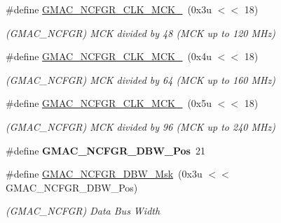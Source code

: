 \begin{DoxyCompactItemize}
\#define \mbox{\hyperlink{group__SAME70__GMAC_gae867aa8a58afa86a0424e23e58c174c1}{G\+M\+A\+C\+\_\+\+N\+C\+F\+G\+R\+\_\+\+C\+L\+K\+\_\+\+M\+C\+K\+\_}}~(0x3u $<$$<$ 18)
\begin{DoxyCompactList}\small\item\em (G\+M\+A\+C\+\_\+\+N\+C\+F\+GR) M\+CK divided by 48 (M\+CK up to 120 M\+Hz) \end{DoxyCompactList}\item 
\mbox{\label{group__SAME70__GMAC_gadc409f6fd40424194830af9921e1e638}} 
\#define \mbox{\hyperlink{group__SAME70__GMAC_gadc409f6fd40424194830af9921e1e638}{G\+M\+A\+C\+\_\+\+N\+C\+F\+G\+R\+\_\+\+C\+L\+K\+\_\+\+M\+C\+K\+\_}}~(0x4u $<$$<$ 18)
\begin{DoxyCompactList}\small\item\em (G\+M\+A\+C\+\_\+\+N\+C\+F\+GR) M\+CK divided by 64 (M\+CK up to 160 M\+Hz) \end{DoxyCompactList}\item 
\mbox{\label{group__SAME70__GMAC_gab3bb2d9e8af410ca93b12ae2b92eb403}} 
\#define \mbox{\hyperlink{group__SAME70__GMAC_gab3bb2d9e8af410ca93b12ae2b92eb403}{G\+M\+A\+C\+\_\+\+N\+C\+F\+G\+R\+\_\+\+C\+L\+K\+\_\+\+M\+C\+K\+\_}}~(0x5u $<$$<$ 18)
\begin{DoxyCompactList}\small\item\em (G\+M\+A\+C\+\_\+\+N\+C\+F\+GR) M\+CK divided by 96 (M\+CK up to 240 M\+Hz) \end{DoxyCompactList}\item 
\mbox{\label{group__SAME70__GMAC_ga325e14c2f2079edf60fce7e49438b4c6}} 
\#define {\bfseries G\+M\+A\+C\+\_\+\+N\+C\+F\+G\+R\+\_\+\+D\+B\+W\+\_\+\+Pos}~21
\item 
\mbox{\label{group__SAME70__GMAC_ga22a3e61570b9c91999eee595eb80e7ea}} 
\#define \mbox{\hyperlink{group__SAME70__GMAC_ga22a3e61570b9c91999eee595eb80e7ea}{G\+M\+A\+C\+\_\+\+N\+C\+F\+G\+R\+\_\+\+D\+B\+W\+\_\+\+Msk}}~(0x3u $<$$<$ G\+M\+A\+C\+\_\+\+N\+C\+F\+G\+R\+\_\+\+D\+B\+W\+\_\+\+Pos)
\begin{DoxyCompactList}\small\item\em (G\+M\+A\+C\+\_\+\+N\+C\+F\+GR) Data Bus Width \end{DoxyCompactList}\item 
\mbox{\label{group__SAME70__GMAC_gaf435623facca34b4c13ac0dcd40207cb}} 

\end{DoxyCompactItemize}
